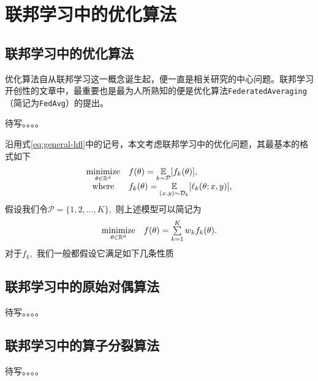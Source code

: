 \chapter{\hspace{-1mm}\bf 联邦学习中的优化算法}
\label{chap2}


\section{联邦学习中的优化算法}

优化算法自从联邦学习这一概念诞生起，便一直是相关研究的中心问题。联邦学习开创性的文章\cite{mcmahan2017fed_avg}中，最重要也是最为人所熟知的便是优化算法\texttt{FederatedAveraging}（简记为\texttt{FedAvg}）的提出。

待写。。。。

沿用式\eqref{eq:general-hfl}中的记号，本文考虑联邦学习中的优化问题，其最基本的格式如下
\begin{equation}
\label{eq:fl-basic-dist}
\begin{array}{cl}
\operatorname*{minimize}\limits_{\theta \in \mathbb{R}^d} & f(\theta) = \operatorname*{\mathbb{E}}\limits_{k \sim {\mathcal{P}}} [f_k(\theta)], \\
\text{where} & f_k(\theta) = \operatorname*{\mathbb{E}}\limits_{(x, y) \sim \mathcal{D}_k} [\ell_k(\theta; x, y)],
\end{array}
\end{equation}
假设我们令$\mathcal{P} = \{1, 2, \ldots, K\},$ 则上述模型可以简记为
\begin{equation}
\label{eq:fl-basic}
\begin{array}{cl}
\operatorname*{minimize}\limits_{\theta \in \mathbb{R}^d} & f(\theta) = \sum\limits_{k=1}^K w_k f_k(\theta).
\end{array}
\end{equation}
对于$f_k,$ 我们一般都假设它满足如下几条性质


\section{联邦学习中的原始对偶算法}

待写。。。。

\section{联邦学习中的算子分裂算法}

待写。。。。
